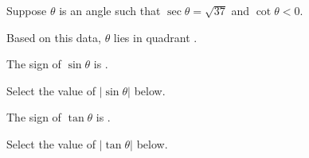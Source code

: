 \documentclass{ximera}
\author{Nela Lakos \and Kyle Parsons}
\begin{document}
\begin{exercise}

Suppose $\theta$ is an angle such that $\sec\theta = \sqrt{37}$ and $\cot\theta < 0$.

Based on this data, $\theta$ lies in quadrant .

The sign of $\sin\theta$ is .

Select the value of $\left|\sin\theta\right|$ below.

\begin{multipleChoice}
\end{multipleChoice}

The sign of $\tan\theta$ is .

Select the value of $\left|\tan\theta\right|$ below.

\begin{multipleChoice}
\end{multipleChoice}

\end{exercise}
\end{document}

